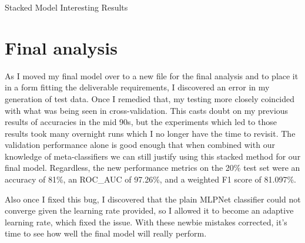 \documentclass[12pt]{article}
\begin{document}
\begin{table}
  \resizebox*{.95\textwidth}{!}{}
  \caption{Stacked Model Interesting Results}
  \label{table3}
\end{table}

\section{Final analysis}
As I moved my final model over to a new file for the final analysis and to place it in a form fitting the deliverable 
requirements, I discovered an error in my generation of test data. Once I remedied that, my testing more closely 
coincided with what was being seen in cross-validation. This casts doubt on my previous results of accuracies in 
the mid 90s, but the experiments which led to those results took many overnight runs which I no longer have the time 
to revisit. The validation performance alone is good enough that when combined with our knowledge of meta-classifiers 
we can still justify using this stacked method for our final model. Regardless, the new performance metrics on 
the 20\% test set were an accuracy of 81\%, an ROC\_AUC of 97.26\%, and a weighted F1 score of 81.097\%.

Also once I fixed this bug, I discovered that the plain MLPNet classifier could not converge given the learning rate provided, 
so I allowed it to become an adaptive learning rate, which fixed the issue. With these newbie mistakes corrected, it's 
time to see how well the final model will really perform.
\end{document}
